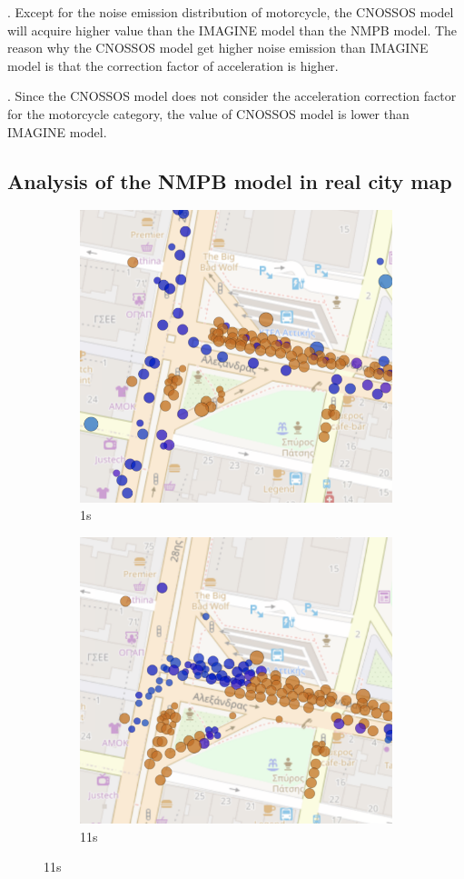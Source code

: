 \documentclass{article}
\begin{document}
. Except for the noise emission distribution of motorcycle, the CNOSSOS model will acquire higher value than the IMAGINE model than the NMPB model. The reason why the CNOSSOS model get higher noise emission than IMAGINE model is that the correction factor of acceleration is higher.

. Since the CNOSSOS model does not consider the acceleration correction factor for the motorcycle category, the value of CNOSSOS model is lower than IMAGINE model.

\newpage

{\color{red} \subsection{Analysis of the NMPB model in real city map}}
\begin{figure}[h]
\begin{subfigure}{.5\textwidth}
  \centering
  \includegraphics[width=.8\linewidth]{1s.png}  
  \caption{1s}
  \label{fig:sub-first}
\end{subfigure}
\begin{subfigure}{.5\textwidth}
  \centering
  \includegraphics[width=.8\linewidth]{11s(1).png}  
  \caption{11s}
  \label{fig:sub-second}
\end{subfigure}


\end{figure}
\end{document}
